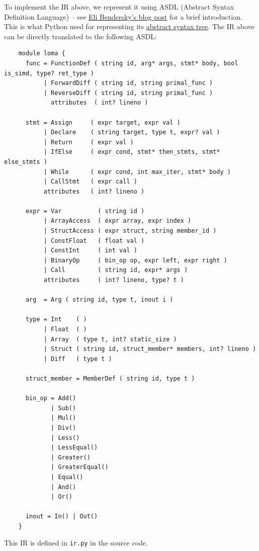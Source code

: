 To implement the IR above, we represent it using ASDL (Abstract Syntax Definition Language) -- see \href{https://eli.thegreenplace.net/2014/06/04/using-asdl-to-describe-asts-in-compilers}{Eli Bendersky's blog post} for a brief introduction. This is what Python used for representing its \href{https://github.com/python/cpython/blob/main/Parser/Python.asdl}{abstract syntax tree}. The IR above can be directly translated to the following ASDL:
\begin{lstlisting}
    module loma {
      func = FunctionDef ( string id, arg* args, stmt* body, bool is_simd, type? ret_type )
           | ForwardDiff ( string id, string primal_func )
           | ReverseDiff ( string id, string primal_func )
             attributes  ( int? lineno )

      stmt = Assign     ( expr target, expr val )
           | Declare    ( string target, type t, expr? val )
           | Return     ( expr val )
           | IfElse     ( expr cond, stmt* then_stmts, stmt* else_stmts )
           | While      ( expr cond, int max_iter, stmt* body )
           | CallStmt   ( expr call )
           attributes   ( int? lineno )

      expr = Var          ( string id )
           | ArrayAccess  ( expr array, expr index )
           | StructAccess ( expr struct, string member_id )
           | ConstFloat   ( float val )
           | ConstInt     ( int val )
           | BinaryOp     ( bin_op op, expr left, expr right )
           | Call         ( string id, expr* args )
           attributes     ( int? lineno, type? t )

      arg  = Arg ( string id, type t, inout i )

      type = Int    ( )
           | Float  ( )
           | Array  ( type t, int? static_size )
           | Struct ( string id, struct_member* members, int? lineno )
           | Diff   ( type t )

      struct_member = MemberDef ( string id, type t )

      bin_op = Add()
             | Sub()
             | Mul()
             | Div()
             | Less()
             | LessEqual()
             | Greater()
             | GreaterEqual()
             | Equal()
             | And()
             | Or()

      inout = In() | Out()
    }
\end{lstlisting}
This IR is defined in \lstinline{ir.py} in the source code.

